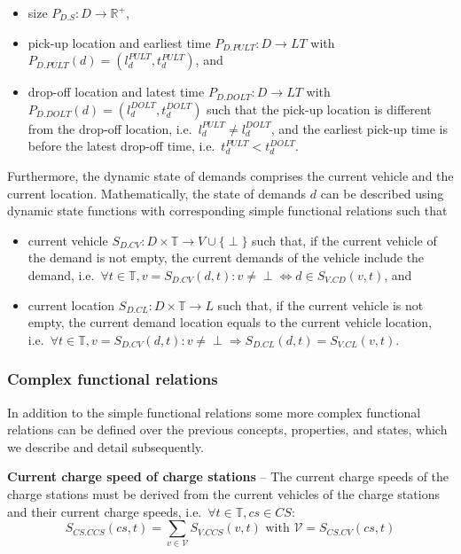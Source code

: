 \documentclass[graybox]{svmult}
\begin{document}
\begin{itemize}
	\item size $P_{D.S}: D \rightarrow \mathbb{R}^+$,
	\item pick-up location and earliest time $P_{D.PULT}: D \rightarrow LT$ with $P_{D.PULT}(d) = (l_d^{PULT},t_d^{PULT})$, and
	\item drop-off location and latest time $P_{D.DOLT}: D \rightarrow LT$ with $P_{D.DOLT}(d) = (l_d^{DOLT},t_d^{DOLT})$ such that the pick-up location is different from the drop-off location, i.e.\ $l_d^{PULT} \neq l_d^{DOLT}$, and the earliest pick-up time is before the latest drop-off time, i.e.\ $t_d^{PULT} < t_d^{DOLT}$.
\end{itemize}
Furthermore, the dynamic state of demands comprises the current vehicle and the current location.
Mathematically, the state of demands $d$ can be described using dynamic state functions with corresponding simple functional relations such that
\begin{itemize}
	\item current vehicle $S_{D.CV}: D \times \mathbb{T} \rightarrow V \cup \{\perp\}$ such that, if the current vehicle of the demand is not empty, the current demands of the vehicle include the demand, i.e.\ $\forall t \in \mathbb{T}, v = S_{D.CV}(d,t): v \neq \perp \Leftrightarrow d \in S_{V.CD}(v,t)$, and
	\item current location $S_{D.CL}: D \times \mathbb{T} \rightarrow L$ such that, if the current vehicle is not empty, the current demand location equals to the current vehicle location, i.e.\ $\forall t \in \mathbb{T}, v = S_{D.CV}(d,t): v \neq \perp \Rightarrow S_{D.CL}(d,t)=S_{V.CL}(v,t)$.
\end{itemize}

\subsubsection{Complex functional relations}

\label{sec:complex}
In addition to the simple functional relations some more complex functional relations can be defined over the previous concepts, properties, and states, which we describe and detail subsequently.

\vspace{4mm}
\noindent
\textbf{Current charge speed of charge stations}
--
The current charge speeds of the charge stations must be derived from the current vehicles of the charge stations and their current charge speeds, i.e.\ $\forall t \in \mathbb{T}, cs \in CS:$
\[
S_{CS.CCS}(cs,t)=\sum_{v \in \mathcal{V}}S_{V.CCS}(v,t) \textrm{ with } \mathcal{V}=S_{CS.CV}(cs,t)
\]
\end{document}
